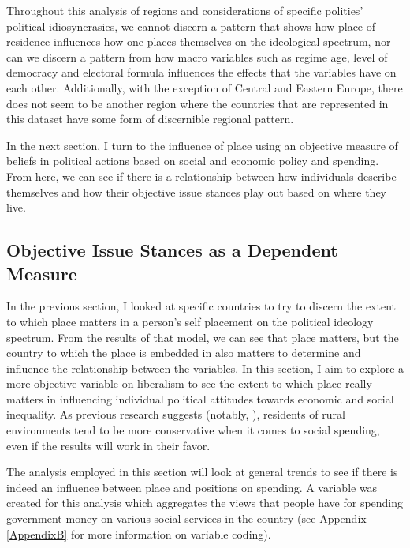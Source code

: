 \documentclass[12pt, titlepage]{article}
\begin{document}
Throughout this analysis of regions and considerations of specific polities' political idiosyncrasies, we cannot discern a pattern that shows how place of residence influences how one places themselves on the ideological spectrum, nor can we discern a pattern from how macro variables such as regime age, level of democracy and electoral formula influences the effects that the variables have on each other. Additionally, with the exception of Central and Eastern Europe, there does not seem to be another region where the countries that are represented in this dataset have some form of discernible regional pattern.

In the next section, I turn to the influence of place using an objective measure of beliefs in political actions based on social and economic policy and spending. From here, we can see if there is a relationship between how individuals describe themselves and how their objective issue stances play out based on where they live.

\subsection{Objective Issue Stances as a Dependent Measure}

In the previous section, I looked at specific countries to try to discern the extent to which place matters in a person's self placement on the political ideology spectrum. From the results of that model, we can see that place matters, but the country to which the place is embedded in also matters to determine and influence the relationship between the variables. In this section, I aim to explore a more objective variable on liberalism to see the extent to which place really matters in influencing individual political attitudes towards economic and social inequality. As previous research suggests (notably, \cite{walsh_putting_2012}), residents of rural environments tend to be more conservative when it comes to social spending, even if the results will work in their favor. 

The analysis employed in this section will look at general trends to see if there is indeed an influence between place and positions on spending. A variable was created for this analysis which aggregates the views that people have for spending government money on various social services in the country (see Appendix \ref{AppendixB} for more information on variable coding). 
\end{document}

